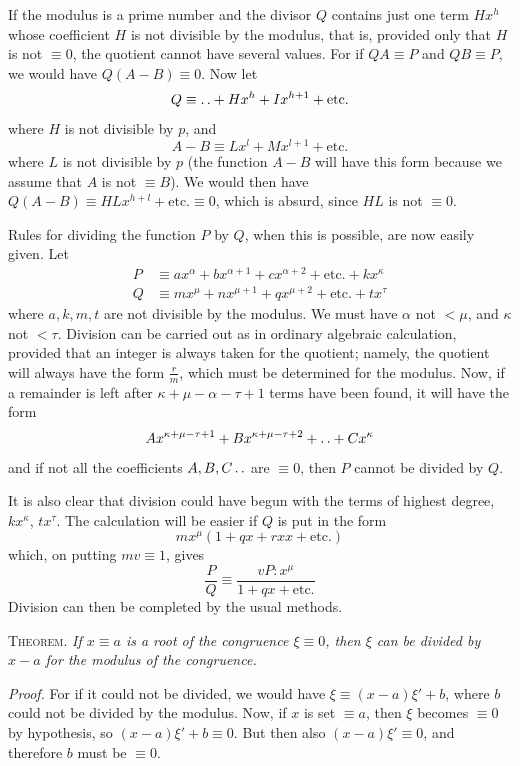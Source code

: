 If the modulus is a prime number and the divisor $Q$ contains just one term $Hx^h$ whose coefficient $H$ is not divisible by the modulus, that is, provided only that $H$ is not $\equiv0$, the quotient cannot have several values. For if $QA\equiv P$ and $QB\equiv P$, we would have $Q(A-B)\equiv0$. Now let
\[
Q\equiv\mathinner{.\,.}+Hx^h+Ix^{h+1}+\text{etc.}
\]
where $H$ is not divisible by $p$, and
\[
A-B\equiv Lx^l+Mx^{l+1}+\text{etc.}
\]
where $L$ is not divisible by $p$ (the function $A-B$ will have this form because we assume that $A$ is not $\equiv B$). We would then have $Q(A-B)\equiv HLx^{h+l}+\text{etc.}\equiv0$, which is absurd, since $HL$ is not $\equiv0$.

Rules for dividing the function $P$ by $Q$, when this is possible, are now easily given. Let
\[
\begin{aligned}
P&\equiv ax^\alpha+bx^{\alpha+1}+cx^{\alpha+2}+\text{etc.}+kx^\kappa\\
Q&\equiv mx^\mu+nx^{\mu+1}+qx^{\mu+2}+\text{etc.}+tx^\tau
\end{aligned}
\]
where $a,k,m,t$ are not divisible by the modulus. We must have $\alpha$ not $<\mu$, and $\kappa$ not $<\tau$. Division can be carried out as in ordinary algebraic calculation, provided that an integer is always taken for the quotient; namely, the quotient will always
have the form $\frac rm$, which must be determined for the modulus. Now, if a remainder is left after $\kappa+\mu-\alpha-\tau+1$ terms have been found, it will have the form
\[
Ax^{\kappa+\mu-\tau+1}+Bx^{\kappa+\mu-\tau+2}+\mathinner{.\,.}+Cx^\kappa
\]
and if not all the coefficients $A,B,C\mathinner{.\,.}$ are $\equiv0$, then $P$ cannot be divided by $Q$.

It is also clear that division could have begun with the terms of highest degree, $kx^\kappa$, $tx^\tau$. The calculation will be easier if $Q$ is put in the form
\[
mx^\mu(1+qx+rxx+\text{etc.})
\]
which, on putting $mv\equiv1$, gives
\[
\frac PQ\equiv\frac{vP:x^\mu}{1+qx+\text{etc.}}
\]
Division can then be completed by the usual methods.

\textsc{Theorem.} \emph{If $x\equiv a$ is a root of the congruence $\xi\equiv0$, then $\xi$ can be divided by $x-a$ for the modulus of the congruence.}

\emph{Proof.} For if it could not be divided, we would have $\xi\equiv(x-a)\xi'+b$, where $b$ could not be divided by the modulus. Now, if $x$ is set $\equiv a$, then $\xi$ becomes $\equiv0$ by hypothesis, so $(x-a)\xi'+b\equiv0$. But then also $(x-a)\xi'\equiv0$, and therefore $b$ must be $\equiv0$.

